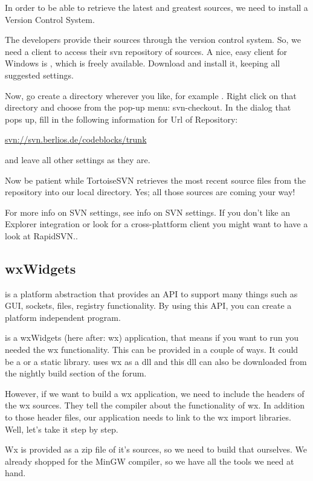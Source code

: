 In order to be able to retrieve the latest and greatest \codeblocks sources, we need to install a Version Control System.

The \codeblocks developers provide their sources through the version control system\cite{url:subversion}. So, we need a client to access their svn repository of sources. A nice, easy client for Windows is \cite{url:tortoisesvn}, which is freely available. Download and install it, keeping all suggested settings.

Now, go create a directory wherever you like, for example . Right click on that directory and choose from the pop-up menu: svn-checkout. In the dialog that pops up, fill in the following information for Url of Repository:

\url{svn://svn.berlios.de/codeblocks/trunk}

and leave all other settings as they are.

Now be patient while TortoiseSVN retrieves the most recent source files from the \codeblocks repository into our local directory. Yes; all those \codeblocks sources are coming your way!

For more info on SVN settings, see info on SVN settings. If you don't like an Explorer integration or look for a cross-plattform client you might want to have a look at RapidSVN..

\subsection{wxWidgets}

\cite{url:wx} is a platform abstraction that provides an API to support many things such as GUI, sockets, files, registry functionality. By using this API, you can create a platform independent program.

\codeblocks is a wxWidgets (here after: wx) application, that means if you want to run \codeblocks you needed the wx functionality. This can be provided in a couple of ways. It could be a  or a static library. \codeblocks uses wx as a dll and this dll can also be downloaded from the nightly build section of the forum.

However, if we want to build a wx application, we need to include the headers of the wx sources. They tell the compiler about the functionality of wx. In addition to those header files, our application needs to link to the wx import libraries. Well, let's take it step by step.

Wx is provided as a zip file of it's sources, so we need to build that ourselves. We already shopped for the MinGW compiler, so we have all the tools we need at hand.

